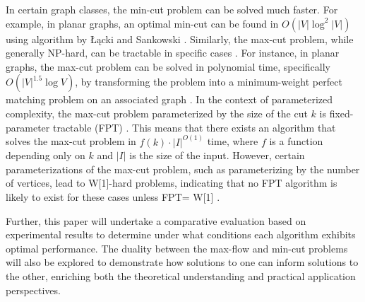 In certain graph classes, the min-cut problem can be solved much faster. For example, in planar graphs, an optimal min-cut can be found in \(O(|V| \log^2 |V|)\) using algorithm by Łącki and Sankowski \cite{lacki2011min}. Similarly, the max-cut problem, while generally NP-hard, can be tractable in specific cases \cite{garey1979computers}. For instance, in planar graphs, the max-cut problem can be solved in polynomial time, specifically \( O(|V|^{1.5} \log V) \), by transforming the problem into a minimum-weight perfect matching problem on an associated graph \cite{liersch_pardella_2008}. In the context of parameterized complexity, the max-cut problem parameterized by the size of the cut \(k\) is fixed-parameter tractable (\textrm{FPT}) \cite{downey2013fundamentals}. This means that there exists an algorithm that solves the max-cut problem in \(f(k) \cdot |I|^{O(1)}\) time, where \(f\) is a function depending only on \(k\) and \(|I|\) is the size of the input. However, certain parameterizations of the max-cut problem, such as parameterizing by the number of vertices, lead to \textrm{W[1]}-hard problems, indicating that no FPT algorithm is likely to exist for these cases unless \textrm{FPT}=
\textrm{W[1]} \cite{downey2013fundamentals}.

Further, this paper will undertake a comparative evaluation based on experimental results to determine under what conditions each algorithm exhibits optimal performance. The duality between the max-flow and min-cut problems will also be explored to demonstrate how solutions to one can inform solutions to the other, enriching both the theoretical understanding and practical application perspectives.